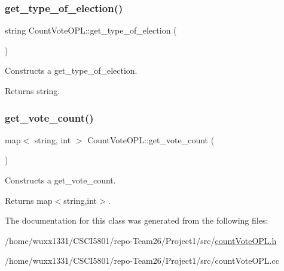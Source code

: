 \subsubsection{\texorpdfstring{get\+\_\+type\+\_\+of\+\_\+election()}{get\_type\_of\_election()}}
{\footnotesize\ttfamily string Count\+Vote\+O\+P\+L\+::get\+\_\+type\+\_\+of\+\_\+election (\begin{DoxyParamCaption}{ }\end{DoxyParamCaption})}



Constructs a get\+\_\+type\+\_\+of\+\_\+election. 

\begin{DoxyReturn}{Returns}
string. 
\end{DoxyReturn}
\mbox{\label{classCountVoteOPL_ad1cafea7b12271681434d5469afaff12}} 
\subsubsection{\texorpdfstring{get\+\_\+vote\+\_\+count()}{get\_vote\_count()}}
{\footnotesize\ttfamily map$<$ string, int $>$ Count\+Vote\+O\+P\+L\+::get\+\_\+vote\+\_\+count (\begin{DoxyParamCaption}{ }\end{DoxyParamCaption})}



Constructs a get\+\_\+vote\+\_\+count. 

\begin{DoxyReturn}{Returns}
map$<$string,int$>$. 
\end{DoxyReturn}


The documentation for this class was generated from the following files\+:\begin{DoxyCompactItemize}
\item 
/home/wuxx1331/\+C\+S\+C\+I5801/repo-\/\+Team26/\+Project1/src/\hyperlink{countVoteOPL_8h}{count\+Vote\+O\+P\+L.\+h}\item 
/home/wuxx1331/\+C\+S\+C\+I5801/repo-\/\+Team26/\+Project1/src/count\+Vote\+O\+P\+L.\+cc\end{DoxyCompactItemize}

